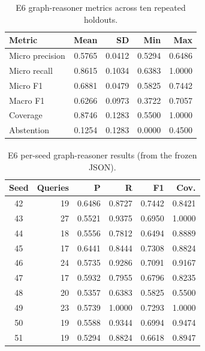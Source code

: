 \documentclass[10pt,twocolumn,a4paper]{extarticle}
\newcommand{\derived}{\textsuperscript{\textdagger}}
\begin{document}
\begin{table}[t]
\centering
\caption{E6 graph-reasoner metrics across ten repeated holdouts.}
\label{tab:e6}
\begin{tabular}{@{}l rrrr@{}}
\toprule
\textbf{Metric} & \textbf{Mean} & \textbf{SD} & \textbf{Min} & \textbf{Max}\\
\midrule
Micro precision & 0.5765 & 0.0412 & 0.5294 & 0.6486\\
Micro recall & 0.8615 & 0.1034 & 0.6383 & 1.0000\\
Micro F1 & 0.6881 & 0.0479 & 0.5825 & 0.7442\\
Macro F1 & 0.6266 & 0.0973 & 0.3722 & 0.7057\\
Coverage & 0.8746 & 0.1283 & 0.5500 & 1.0000\\
Abstention & 0.1254 & 0.1283 & 0.0000 & 0.4500\\
\bottomrule
\end{tabular}
\end{table}

\begin{table}[t]
\centering
\caption{E6 per-seed graph-reasoner results\derived{} (from the frozen JSON).}
\label{tab:e6seed}
\begin{tabular}{@{}c r rrr r@{}}
\toprule
\textbf{Seed} & \textbf{Queries} & \textbf{P} & \textbf{R} & \textbf{F1} & \textbf{Cov.}\\
\midrule
42 & 19 & 0.6486 & 0.8727 & 0.7442 & 0.8421\\
43 & 27 & 0.5521 & 0.9375 & 0.6950 & 1.0000\\
44 & 18 & 0.5556 & 0.7812 & 0.6494 & 0.8889\\
45 & 17 & 0.6441 & 0.8444 & 0.7308 & 0.8824\\
46 & 24 & 0.5735 & 0.9286 & 0.7091 & 0.9167\\
47 & 17 & 0.5932 & 0.7955 & 0.6796 & 0.8235\\
48 & 20 & 0.5357 & 0.6383 & 0.5825 & 0.5500\\
49 & 23 & 0.5739 & 1.0000 & 0.7293 & 1.0000\\
50 & 19 & 0.5588 & 0.9344 & 0.6994 & 0.9474\\
51 & 19 & 0.5294 & 0.8824 & 0.6618 & 0.8947\\
\bottomrule
\end{tabular}
\end{table}
\end{document}
